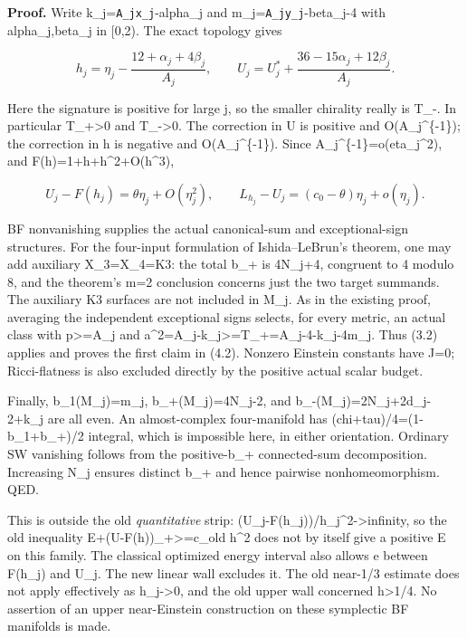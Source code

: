 \documentclass[
  10pt,
]{article}
\begin{document}
\textbf{Proof.} Write k\_j=\nolinkurl{A_jx_j}-alpha\_j and m\_j=\nolinkurl{A_jy_j}-beta\_j-4
with alpha\_j,beta\_j in {[}0,2). The exact topology gives

\[
 h_j=\eta_j-\frac{12+\alpha_j+4\beta_j}{A_j},\qquad
 U_j=U_j^*+\frac{36-15\alpha_j+12\beta_j}{A_j}.          \tag{4.3}
\]

Here the signature is positive for large j, so the smaller chirality
really is T\_-. In particular T\_+\textgreater0 and T\_-\textgreater0.
The correction in U is positive and O(A\_j\^{}\{-1\}); the correction in
h is negative and O(A\_j\^{}\{-1\}). Since
A\_j\^{}\{-1\}=o(eta\_j\^{}2), and F(h)=1+h+h\^{}2+O(h\^{}3),

\[
 U_j-F(h_j)=\theta\eta_j+O(\eta_j^2),\qquad
 L_{h_j}-U_j=(c_0-\theta)\eta_j+o(\eta_j).              \tag{4.4}
\]

BF nonvanishing supplies the actual canonical-sum and exceptional-sign
structures. For the four-input formulation of Ishida--LeBrun's theorem,
one may add auxiliary X\_3=X\_4=K3: the total b\_+ is 4N\_j+4, congruent
to 4 modulo 8, and the theorem's m=2 conclusion concerns just the two
target summands. The auxiliary K3 surfaces are not included in M\_j. As
in the existing proof, averaging the independent exceptional signs
selects, for every metric, an actual class with p\textgreater=A\_j and
a\^{}2=A\_j-k\_j\textgreater=T\_+=A\_j-4-k\_j-4m\_j. Thus (3.2) applies
and proves the first claim in (4.2). Nonzero Einstein constants have
J=0; Ricci-flatness is also excluded directly by the positive actual
scalar budget.

Finally, b\_1(M\_j)=m\_j, b\_+(M\_j)=4N\_j-2, and
b\_-(M\_j)=2N\_j+2d\_j-2+k\_j are all even. An almost-complex
four-manifold has (chi+tau)/4=(1-b\_1+b\_+)/2 integral, which is
impossible here, in either orientation. Ordinary SW vanishing follows
from the positive-b\_+ connected-sum decomposition. Increasing N\_j
ensures distinct b\_+ and hence pairwise nonhomeomorphism. QED.

This is outside the old \emph{quantitative} strip:
(U\_j-F(h\_j))/h\_j\^{}2-\textgreater infinity, so the old inequality
E+(U-F(h))\_+\textgreater=c\_old h\^{}2 does not by itself give a
positive E on this family. The classical optimized energy interval also
allows e between F(h\_j) and U\_j. The new linear wall excludes it. The
old near-1/3 estimate does not apply effectively as h\_j-\textgreater0,
and the old upper wall concerned h\textgreater1/4. No assertion of an
upper near-Einstein construction on these symplectic BF manifolds is
made.
\end{document}

